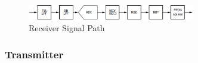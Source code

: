 

\begin{figure}[htbp]
    \centering
    \includegraphics[width=0.65\textwidth]{./figures/rx_chain}
    \caption{ Receiver Signal Path
    \label{fig:rxchain}}
\end{figure}


\subsubsection{Transmitter}


